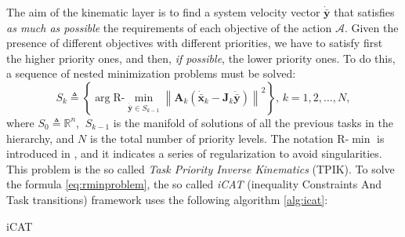 The aim of the kinematic layer is to find a system velocity vector $\dot{\bar{\boldsymbol{y}}}$ that satisfies \textit{as much as possible} the requirements of each objective of the action $\mathcal{A}$. Given the presence of different objectives with different priorities, we have to satisfy first the higher priority ones, and then, \textit{if possible}, the lower priority ones. To do this, a sequence of nested minimization problems must be solved: 
\begin{equation}\label{eq:rminproblem}
S_k \triangleq \left\{ \arg \mathrm{R\textrm{-}}\min_{\dot{\bar{\boldsymbol{y}}} \in S_{k-1}} \left\| \boldsymbol{A}_k (\dot{\bar{\boldsymbol{x}}}_k - \boldsymbol{J}_k \dot{\bar{\boldsymbol{y}}}) \right\|^2 \right\},\, k = 1, 2, \ldots, N,
\end{equation}
where $S_0 \triangleq \mathbb{R}^n$, $\:S_{k-1}$ is the manifold of solutions of all the previous tasks in the hierarchy, and $N$ is the total number of priority levels. The notation $\mathrm{R\textrm{-}}\min$ is introduced in \cite{IntroMaris1}, and it indicates a series of regularization to avoid singularities.\\
This problem is the so called \textit{Task Priority Inverse Kinematics} (TPIK). To solve the formula  \eqref{eq:rminproblem}, the so called \textit{iCAT} (inequality Constraints And Task transitions) framework uses the following algorithm \ref{alg:icat}:
\begin{algorithm}[H]
	\caption{iCAT} \label{alg:icat}
	\begin{algorithmic} [1] {\large
		\vspace{5px}
		\vspace{5px}
				\vspace{5px}
		\vspace{5px}
		\vspace{5px}
		\ENDFOR 
		\vspace{5px}
	}
	\end{algorithmic}
\end{algorithm}

